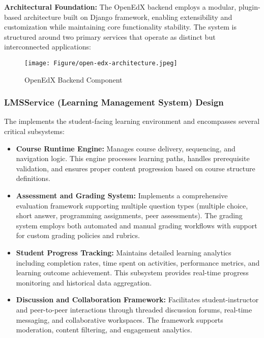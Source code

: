 \documentclass[../Main.tex]{subfiles}
\begin{document}
{{	\textbf{Architectural Foundation:} The OpenEdX backend employs a modular,
	plugin-based architecture built on Django framework, enabling extensibility and
	customization while maintaining core functionality stability. The system is
	structured around two primary services that operate as distinct but
	interconnected applications:

	\begin{figure}[H]
		\centering
		\texttt{[image: Figure/open-edx-architecture.jpeg]}
		\caption{OpenEdX Backend Component}
		\label{fig:OpenEdX_Backend_Component}
	\end{figure}

	\subsubsection{LMSService (Learning Management System) Design}
	\label{section:4.2.2.1_lmservice_learning_management_system_design} The 
	implements the student-facing learning environment and encompasses several critical
	subsystems:

	\begin{itemize}
		\item \textbf{Course Runtime Engine:} Manages course delivery, sequencing,
			and navigation logic. This engine processes learning paths, handles
			prerequisite validation, and ensures proper content progression based on course
			structure definitions.

		\item \textbf{Assessment and Grading System:} Implements a comprehensive
			evaluation framework supporting multiple question types (multiple choice,
			short answer, programming assignments, peer assessments). The grading
			system employs both automated and manual grading workflows with support
			for custom grading policies and rubrics.

		\item \textbf{Student Progress Tracking:} Maintains detailed learning
			analytics including completion rates, time spent on activities,
			performance metrics, and learning outcome achievement. This subsystem
			provides real-time progress monitoring and historical data aggregation.

		\item \textbf{Discussion and Collaboration Framework:} Facilitates student-instructor
			and peer-to-peer interactions through threaded discussion forums, real-time
			messaging, and collaborative workspaces. The framework supports moderation,
			content filtering, and engagement analytics.


\end{itemize}}}
\end{document}
